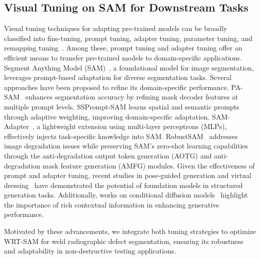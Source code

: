 \subsection{Visual Tuning on SAM for Downstream Tasks}  
\label{subsec2.2}

Visual tuning techniques for adapting pre-trained models can be broadly classified into fine-tuning, prompt tuning, adapter tuning, parameter tuning, and remapping tuning~\cite{yu2024visual}. Among these, prompt tuning and adapter tuning offer an efficient means to transfer pre-trained models to domain-specific applications. 
Segment Anything Model (SAM)~\cite{kirillov2023segment}, a foundational model for image segmentation, leverages prompt-based adaptation for diverse segmentation tasks. Several approaches have been proposed to refine its domain-specific performance. PA-SAM~\cite{xie2024pa} enhances segmentation accuracy by refining mask decoder features at multiple prompt levels. SSPrompt-SAM learns spatial and semantic prompts through adaptive weighting, improving domain-specific adaptation. SAM-Adapter~\cite{chen2023sam}, a lightweight extension using multi-layer perceptrons (MLPs), effectively injects task-specific knowledge into SAM. RobustSAM~\cite{chen2024robustsam} addresses image degradation issues while preserving SAM’s zero-shot learning capabilities through the anti-degradation output token generation (AOTG) and anti-degradation mask feature generation (AMFG) modules.
Given the effectiveness of prompt and adapter tuning, recent studies in pose-guided generation and virtual dressing~\cite{shen2024imagpose, shen2024imagdressing} have demonstrated the potential of foundation models in structured generation tasks. Additionally, works on conditional diffusion models~\cite{shen2023advancing, shen2024boosting} highlight the importance of rich contextual information in enhancing generative performance. 

Motivated by these advancements, we integrate both tuning strategies to optimize WRT-SAM for weld radiographic defect segmentation, ensuring its robustness and adaptability in non-destructive testing applications.


